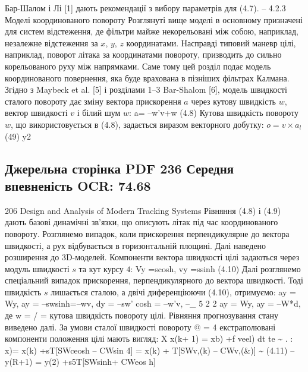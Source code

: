 \documentclass[11pt]{article}
\begin{document}
Бар-Шалом і Лі [1] дають рекомендації з вибору параметрів для (4.7).
-- 
4.2.3 Моделі координованого повороту
Розглянуті вище моделі в основному призначені для систем відстеження, де фільтри
майже некорельовані між собою, наприклад, незалежне відстеження за
$x$, $y$, $z$ координатами. Насправді типовий маневр цілі, наприклад,
поворот літака за координатами повороту, призводить до сильно корельованого
руху між напрямками. Саме тому цей розділ подає модель координованого
повернення, яка буде врахована в пізніших фільтрах Калмана.
Згідно з Maybeck et al. [5] і розділами 1–3 Bar-Shalom [6], модель
швидкості сталого повороту дає зміну вектора прискорення $a$
через кутову швидкість $w$, вектор швидкості $v$ і білий шум $w$:
a= --w'v+w (4.8)
Кутова швидкість повороту $w$, що використовується в (4.8), задається
виразом векторного добутку: $o = v \times a_l$ (49)
y2
\clearpage\subsection*{Джерельна сторінка PDF 236 \quad Середня впевненість OCR: 74.68}
206 Design and Analysis of Modern Tracking Systems
Рівняння (4.8) і (4.9) дають базові динамічні зв’язки, що описують
літак під час координованого повороту. Розглянемо випадок, коли
прискорення перпендикулярне до вектора швидкості, а рух відбувається в
горизонтальній площині. Далі наведено розширення до 3D-моделей.
Компоненти вектора швидкості цілі задаються через модуль швидкості $s$
та кут курсу $4$:
Vy =scosh, vy =ssinh (4.10)
Далі розглянемо спеціальний випадок прискорення, перпендикулярного
до вектора швидкості. Тоді швидкість $s$ лишається сталою, а двічі
диференціюючи (4.10), отримуємо:
ay = Wy, ay = --swsinh=--wv,
dy = --sw' cosh = --w'v,
--\_ 5 2 2
ay = Wy, ay = --W*d,
де w = / = кутова швидкість повороту цілі.
Рівняння прогнозування стану виведено далі. За умови сталої швидкості
повороту @ = 4 екстраполювані компоненти положення цілі мають вигляд:
X
x(k+ 1) = xb) +f veel) dt
te \textasciitilde{} . :
x)=
x(k) +sT[SWceosh -- CWsin 4]
= x(k) + T[SWv,(k) -- CWv,(\&)] \textasciitilde{} (4.11)
--y(R+1) = y(2) +s5T[SWsinh+ CWeos h]
\end{document}
